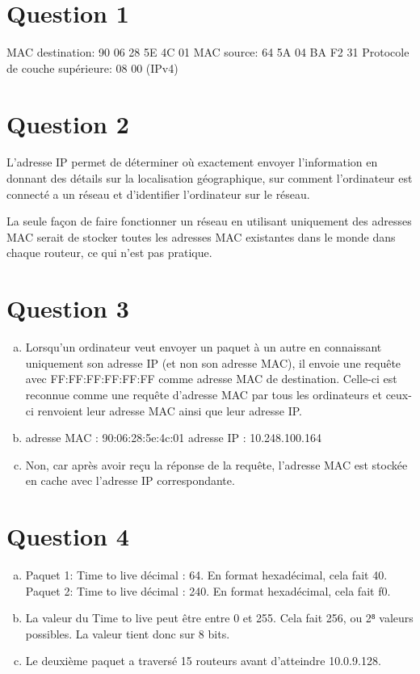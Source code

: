 
\section{Question 1}
MAC destination: 90 06 28 5E 4C 01 
MAC source: 64 5A 04 BA F2 31
Protocole de couche supérieure: 08 00 (IPv4)

\section{Question 2}
L'adresse IP permet de déterminer où exactement envoyer l'information  en donnant des détails sur la localisation géographique, sur comment l'ordinateur est connecté a un réseau et d'identifier l'ordinateur sur le réseau.

La seule façon de faire fonctionner un réseau en
utilisant uniquement des adresses MAC serait de
stocker toutes les adresses MAC existantes dans le monde
dans chaque routeur, ce qui n’est pas pratique.

\section{Question 3}
\begin{enumerate}[(a)]
	\item Lorsqu'un ordinateur veut envoyer un paquet à un autre en connaissant uniquement son adresse IP (et non son adresse MAC), il envoie une requête avec FF:FF:FF:FF:FF:FF comme adresse MAC de destination. Celle-ci est reconnue comme une requête d'adresse MAC par tous les ordinateurs et ceux-ci renvoient leur adresse MAC ainsi que leur adresse IP.
	\item adresse MAC : 90:06:28:5e:4c:01
	adresse IP : 10.248.100.164
	\item Non, car après avoir reçu la réponse de
	la requête, l'adresse MAC est stockée en cache
	 avec l'adresse IP correspondante.
\end{enumerate}

\section{Question 4}
\begin{enumerate}[(a)]
	\item Paquet 1: Time to live décimal : 64. En format hexadécimal, cela fait 40. 
	Paquet 2: Time to live décimal : 240. En format hexadécimal, cela fait f0.
	\item La valeur du Time to live peut être entre 0 et 255. Cela fait 256, ou 2⁸ valeurs possibles. La valeur tient donc sur 8 bits.

	\item Le deuxième paquet a traversé 15 routeurs avant d'atteindre 10.0.9.128.
\end{enumerate}
